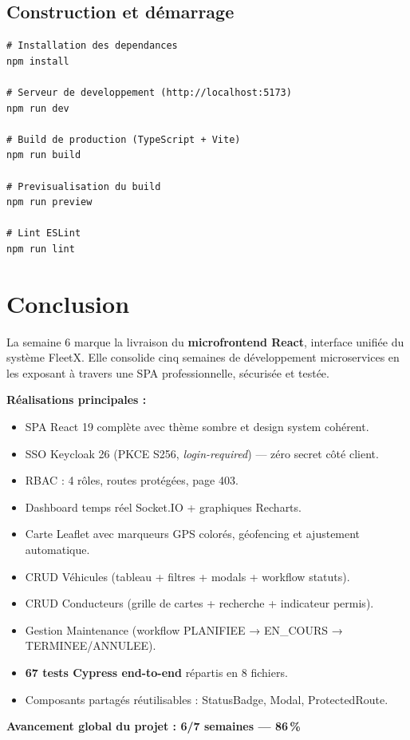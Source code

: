 \documentclass[12pt,a4paper]{report}
\begin{document}
\section{Construction et démarrage}

\begin{lstlisting}[style=shell, caption=Scripts npm disponibles]
# Installation des dependances
npm install

# Serveur de developpement (http://localhost:5173)
npm run dev

# Build de production (TypeScript + Vite)
npm run build

# Previsualisation du build
npm run preview

# Lint ESLint
npm run lint
\end{lstlisting}

\chapter*{Conclusion}

La semaine 6 marque la livraison du \textbf{microfrontend React}, interface unifiée
du système FleetX. Elle consolide cinq semaines de développement microservices
en les exposant à travers une SPA professionnelle, sécurisée et testée.

\textbf{Réalisations principales :}
\begin{itemize}
  \item SPA React 19 complète avec thème sombre et design system cohérent.
  \item SSO Keycloak 26 (PKCE S256, \textit{login-required}) — zéro secret côté client.
  \item RBAC : 4 rôles, routes protégées, page 403.
  \item Dashboard temps réel Socket.IO + graphiques Recharts.
  \item Carte Leaflet avec marqueurs GPS colorés, géofencing et ajustement automatique.
  \item CRUD Véhicules (tableau + filtres + modals + workflow statuts).
  \item CRUD Conducteurs (grille de cartes + recherche + indicateur permis).
  \item Gestion Maintenance (workflow PLANIFIEE → EN\_COURS → TERMINEE/ANNULEE).
  \item \textbf{67 tests Cypress end-to-end} répartis en 8 fichiers.
  \item Composants partagés réutilisables : StatusBadge, Modal, ProtectedRoute.
\end{itemize}

\vspace{0.4cm}
\textbf{Avancement global du projet : 6/7 semaines — 86\,\%}
\end{document}
